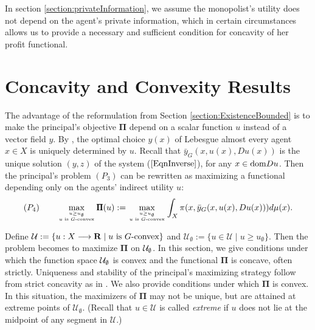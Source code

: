 \medskip


%


In section \ref{section:privateInformation},  we assume the monopolist's utility does not depend on the agent's private information, which in certain circumstances allows us to provide a necessary and sufficient condition for concavity of her profit functional.
\medskip



\medskip


\section{Concavity and Convexity Results}\label{section:concavity}
The advantage of the reformulation from Section \ref{section:ExistenceBounded} is to make the principal's objective $\pmb \Pi$ 
depend on a scalar function $u$ instead of a vector field $y$.
By \Gone, the optimal choice $y(x)$ of   Lebesgue almost every agent $x\in X$
is uniquely determined by $u$.  Recall that $\bar{y}_G(x, u(x), Du(x))$ is the unique solution $(y,z)$ of the system ($\ref{EqnInverse}$), for any $x\in {\mathop{\rm dom}} Du$. 
Then the principal's problem $(P_3)$ can be rewritten as maximizing a functional 
depending only on the agents' indirect utility $u$:
\begin{equation}\label{eqn:principalFinal}
	(P_4) \ \ \ \ \ \  \max\limits_{ u\ge u_{\emptyset} \atop \text{$u$ is $G$-convex}} \pmb\Pi(u) := \max\limits_{u \ge u_{\emptyset} \atop \text{$u$ is $G$-convex}} \int_X \pi(x, \bar{y}_G(x, u(x), Du(x)))  d \mu(x) .
\end{equation}


Define $\mathcal{U}:=\{u:X\longrightarrow {\mathbf R} \mid  u \text{ is } G\text{-convex}\}$
and $\mathcal{U}_{\emptyset}:=\{u \in \mathcal{U}\mid  u\ge u_{\emptyset}\}$. 
Then the problem becomes to maximize $\pmb\Pi$ on $\mathcal{U}_{\emptyset}$. 
In this section, we give conditions under which the function space $\mathcal{U}_{\emptyset}$ 
is convex and the functional $\pmb\Pi$ is concave, often strictly.
Uniqueness and stability of the principal's maximizing strategy follow from strict concavity as in \cite{FigalliKimMcCann11}. We also provide conditions under which $\pmb\Pi$ is convex. In this situation, the maximizers of $\pmb\Pi$ may not be unique, but are attained at extreme points of 
$\mathcal{U}_{\emptyset}$. (Recall that $u \in \mathcal{U}$ is called {\em extreme} if 
$u$ does not lie at the midpoint of any segment in $\mathcal{U}$.)
\medskip


